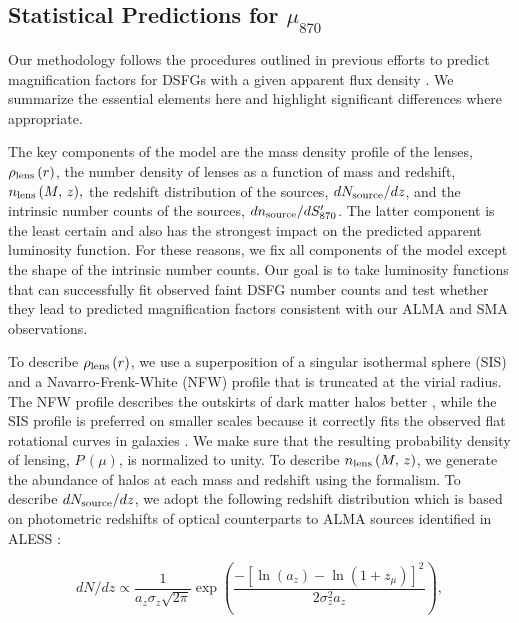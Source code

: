 \documentclass[iop]{emulateapj}
\begin{document}
\subsection{Statistical Predictions for $\mu_{870}$}\label{sec:statpredict}

Our methodology follows the procedures outlined in previous efforts to predict
magnification factors for DSFGs with a given apparent flux density
\citep[chiefly,][]{Lima:2010fk, Wardlow:2013lr, Fialkov:2015eu}.  We summarize
the essential elements here and highlight significant differences where
appropriate.  

The key components of the model are the mass density profile of the lenses,
$\rho_{\rm lens}\,(r)$, the number density of lenses as a function of mass and
redshift, $n_{\rm lens}\,(M, \, z),$ the redshift distribution of the sources,
$dN_{\rm source}/dz$, and the intrinsic number counts of the sources,
$dn_{\rm source}/dS_{870}^\prime$.  The latter component is the least certain
and also has the strongest impact on the predicted apparent luminosity
function.  For these reasons, we fix all components of the model except the
shape of the intrinsic number counts.  Our goal is to take luminosity
functions that can successfully fit observed faint DSFG number counts
\citep{Karim:2013lr} and test whether they lead to predicted magnification
factors consistent with our ALMA and SMA observations.

To describe $\rho_{\rm lens}\,(r)$, we use a superposition of a singular
isothermal sphere (SIS) and a Navarro-Frenk-White (NFW) profile
\citep{Navarro:1997ys} that is truncated at the virial radius.  The NFW profile
describes the outskirts of dark matter halos better \citep{Mandelbaum:2005lr},
while the SIS profile is preferred on smaller scales because it correctly fits
the observed flat rotational curves in galaxies \citep{Kochanek:1994fk}.  We
make sure that the resulting probability density of lensing, $P\,(\mu)$, is
normalized to unity.  To describe $n_{\rm lens}\,(M, \, z)$, we generate the
abundance of halos at each mass and redshift using the \citet{Sheth:1999kx}
formalism.  To describe $dN_{\rm source}/dz$, we adopt the following redshift
distribution which is based on photometric redshifts of optical counterparts to
ALMA sources identified in ALESS \citep{Simpson:2014lr}:

\begin{equation}
    dN/dz \propto \frac{1}{a_z\sigma_z \sqrt{2\pi}}
    \exp\left( \frac{-[\ln(a_z) - \ln(1 + z_\mu)]^2} {2\sigma_z^2 a_z} \right),
\end{equation}
\end{document}
